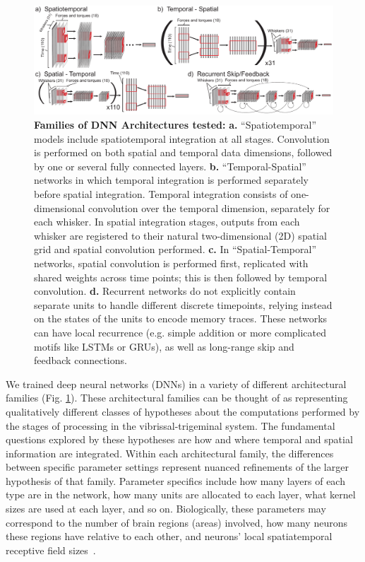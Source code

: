 \begin{figure}
\centering
\includegraphics [width=.9\linewidth]{figures/architectures.pdf}
\vspace{-4mm}
\caption{\footnotesize{\textbf{Families of DNN Architectures tested:} \textbf{a.} ``Spatiotemporal'' models include spatiotemporal integration at all stages. Convolution is performed on both spatial and temporal data dimensions, followed by one or several fully connected layers. \textbf{b.} ``Temporal-Spatial'' networks in which temporal integration is performed separately before spatial integration.  Temporal integration consists of one-dimensional convolution over the temporal dimension, separately for each whisker. In spatial integration stages, outputs from each whisker are registered to their natural two-dimensional (2D) spatial grid and spatial convolution performed.  \textbf{c.} In ``Spatial-Temporal'' networks, spatial convolution is performed first, replicated with shared weights across time points; this is then followed by temporal convolution. \textbf{d.} Recurrent networks do not explicitly contain separate units to handle different discrete timepoints, relying instead on the states of the units to encode memory traces.  These networks can have local recurrence (e.g. simple addition or more complicated motifs like LSTMs or GRUs), as well as long-range skip and feedback connections.}~\label{fig_archi}}
\vspace{-5mm}
\end{figure}

We trained deep neural networks (DNNs) in a variety of different architectural families (Fig. \ref{fig_archi}).  
These architectural families can be thought of as representing qualitatively different classes of hypotheses about the computations performed by the stages of processing in the vibrissal-trigeminal system. 
The fundamental questions explored by these hypotheses are how and where temporal and spatial information are integrated.
Within each architectural family, the differences between specific parameter settings represent nuanced refinements of the larger hypothesis of that family.   
Parameter specifics include how many layers of each type are in the network, how many units are allocated to each layer, what kernel sizes are used at each layer, and so on.  
Biologically, these parameters may correspond to the number of brain regions (areas) involved, how many neurons these regions have relative to each other, and neurons' local spatiatemporal receptive field sizes~\cite{yamins2016using}.
 
